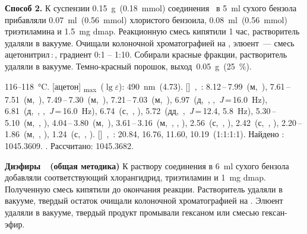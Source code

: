 \textbf{Способ 2.} К суспензии \SI{0.15}{\gram}~(\SI{0.18}{\mmol}) соединения~\textbf{} в \SI{5}{\milli\litre} сухого бензола прибавляли \SI{0.07}{\milli\litre}~(\SI{0.56}{\mmol}) хлористого бензоила, \SI{0.08}{\milli\litre}~(\SI{0.56}{\mmol}) триэтиламина и \SI{1.5}{\milli\gram} \ac{dmap}.
Реакционную смесь кипятили 1 час, растворитель удаляли в вакууме.
Очищали колоночной хроматографией на , элюент~--- смесь ацетонитрил\,:\,, градиент 0:1 -- 1:10.
Собирали красные фракции, растворитель удаляли в вакууме. Темно-красный порошок, выход~\SI{0.05}{\gram}~(\SI{25}{\percent}).
\begin{experimental}
     116--\SI{118}{\celsius}.
    [ацетон] \chemlambda\textsubscript{max}~($\lg \varepsilon$): \SI{490}{\nano\metre}~(4.73).
    []~\chemdelta,~\si{\ppm}: 8.12\,--\,7.99~(м,~), 7.61\,--\,7.51~(м,~), 7.49\,--\,7.30~(м,~), 7.21\,--\,7.03~(м,~), 6.97~(д,~, ,~\textit{J}\,=\,16.0~\si{\hertz}), 6.81~(д,~, ,~\textit{J}\,=\,16.0~\si{\hertz}), 6.74~(с,~, ), 5.72~(дд,~,~\textit{J}\,=\,12.4, 5.8~\si{\hertz}), 5.30\,--\,5.10~(м,~, ), 4.04\,--\,3.80~(м,~), 3.61\,--\,3.16~(м,~, , ), 2.56~(с,~, ), 2.42~(с,~, ), 2.20\,--\,1.86~(м,~, ), 1.24~(с,~, ).
    []~\chemdelta,~\si{\ppm}: 20.84, 16.76, 11.60, 10.19~(1:1:1:1).
     Найдено \ce{[M + H]+}: \num{1045.3609}. . Рассчитано: \ce{[M + H]} \num{1045.3682}.
\end{experimental}

\textbf{Диэфиры~~(общая методика)}
К раствору соединения  в \SI{6}{\milli\litre} сухого бензола добавляли соответствующий хлорангидрид, триэтиламин и \SI{1}{\milli\gram} \ac{dmap}.
Полученную смесь кипятили до окончания реакции.
Растворитель удаляли в вакууме, твердый остаток очищали колоночной хроматографией на .
Элюент удаляли в вакууме, твердый продукт промывали гексаном или смесью гексан-эфир.

